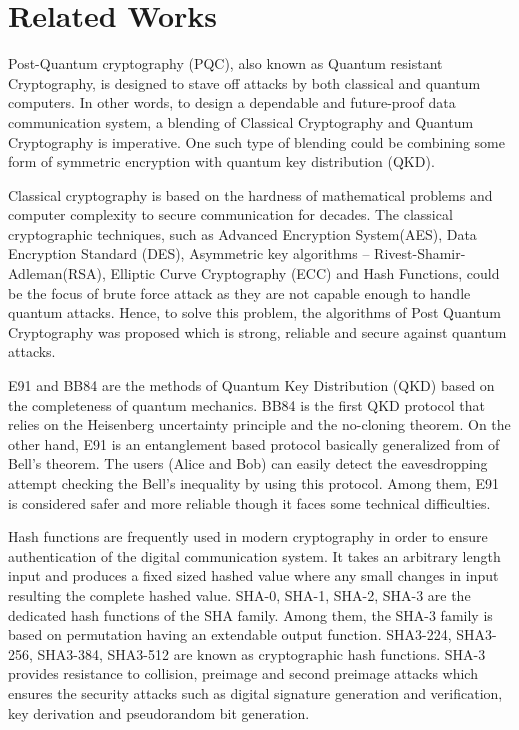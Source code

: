 \documentclass[12pt]{article}
\begin{document}
\section{Related Works}
\label{sec:relatedWorks}
Post-Quantum cryptography (PQC), also known as Quantum resistant Cryptography, is designed to stave off attacks by both classical and quantum computers. In other words, to design a dependable and future-proof data communication system, a blending of Classical Cryptography and Quantum Cryptography is imperative. One such type of blending could be combining some form of symmetric encryption with quantum key distribution (QKD).

Classical cryptography is based on the hardness of mathematical problems and computer complexity to secure communication for decades. The classical cryptographic techniques, such as Advanced Encryption System(AES), Data Encryption Standard (DES), Asymmetric key algorithms -- Rivest-Shamir-Adleman(RSA), Elliptic Curve Cryptography (ECC) and Hash Functions, could be the focus of brute force attack as they are not capable enough to handle quantum attacks. Hence, to solve this problem, the algorithms of Post Quantum Cryptography was proposed which is strong, reliable and secure against quantum attacks.\cite{sharma2023post}

E91 and BB84 are the methods of Quantum Key Distribution (QKD) based on the completeness of quantum mechanics. BB84 is the first QKD protocol that relies on the Heisenberg uncertainty principle and the no-cloning theorem. On the other hand,  E91 is an entanglement based protocol basically generalized from of Bell's theorem. The users (Alice and Bob) can easily detect the eavesdropping attempt checking the Bell's inequality by using this protocol. \cite{ekert1991quantum} Among them, E91 is considered safer and more reliable though it faces some technical difficulties.\cite{alvarez2016comparison}

Hash functions are frequently used in modern cryptography in order to ensure authentication of the digital communication system. It takes an arbitrary length input and produces a fixed sized hashed value where any small changes in input resulting the complete hashed value. SHA-0, SHA-1, SHA-2, SHA-3 are the dedicated hash functions of the SHA family.\cite{madhuravani2013cryptographic} Among them, the SHA-3 family is based on permutation having an extendable output function. SHA3-224, SHA3-256, SHA3-384, SHA3-512 are known as cryptographic hash functions. SHA-3 provides resistance to collision, preimage and second preimage attacks which ensures the security attacks such as digital signature generation and verification, key derivation and pseudorandom bit generation. \cite{dworkin2015sha}
\end{document}
